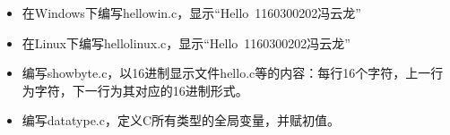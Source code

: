 \begin{itemize}
	\item 在Windows下编写hellowin.c，显示“Hello\ 1160300202冯云龙” %
	\item 在Linux下编写hellolinux.c，显示“Hello\ 1160300202冯云龙” %
	\item 编写showbyte.c，以16进制显示文件hello.c等的内容：每行16个字符，上一行为字符，下一行为其对应的16进制形式。
	\item 编写datatype.c，定义C所有类型的全局变量，并赋初值。%
\end{itemize}